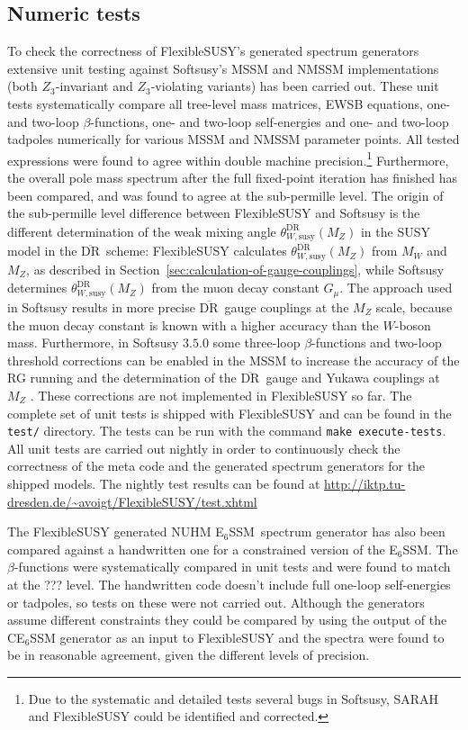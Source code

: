 \documentclass[final,3p,11pt,pdflatex]{elsarticle}
\makeatletter
\newcommand{\fs}{FlexibleSUSY\@\xspace}
\newcommand{\ESSM}{E$_6$SSM\@\xspace}
\newcommand{\code}[1]{\lstinline|#1|}  %
\newcommand{\textoverline}[1]{$\overline{\mbox{#1}}$}
\newcommand{\DRbar}{\textoverline{DR}\xspace}
\newcommand{\secref}[1]{Section~\ref{#1}}
\makeatother
\begin{document}
\subsection{Numeric tests}

To check the correctness of \fs's generated spectrum generators
extensive unit testing against Softsusy's MSSM and NMSSM
implementations (both $Z_3$-invariant and $Z_3$-violating variants)
has been carried out.  These unit tests systematically compare all
tree-level mass matrices, EWSB equations, one- and two-loop
$\beta$-functions, one- and two-loop self-energies and one- and
two-loop tadpoles numerically for various MSSM and NMSSM parameter
points.  All tested expressions were found to agree within double
machine precision.\footnote{Due to the systematic and detailed tests
  several bugs in Softsusy, SARAH and \fs could be identified and
  corrected.}  Furthermore, the overall pole mass spectrum after the
full fixed-point iteration has finished has been compared, and was
found to agree at the sub-permille level.  The origin of the
sub-permille level difference between \fs and Softsusy is the
different determination of the weak mixing angle
$\theta_{W,\text{susy}}^{\text{\DRbar}}(M_Z)$ in the SUSY model in the
\DRbar\ scheme: \fs calculates
$\theta_{W,\text{susy}}^{\text{\DRbar}}(M_Z)$ from $M_W$ and $M_Z$, as
described in \secref{sec:calculation-of-gauge-couplings}, while
Softsusy determines $\theta_{W,\text{susy}}^{\text{\DRbar}}(M_Z)$ from
the muon decay constant $G_\mu$.  The approach used in Softsusy
results in more precise \DRbar\ gauge couplings at the $M_Z$ scale,
because the muon decay constant is known with a higher accuracy than
the $W$-boson mass.  Furthermore, in Softsusy $3.5.0$ some three-loop
$\beta$-functions and two-loop threshold corrections can be enabled in
the MSSM to increase the accuracy of the RG running and the
determination of the \DRbar\ gauge and Yukawa couplings at $M_Z$
\cite{Allanach:2014nba}.  These corrections are not implemented in \fs
so far.  The complete set of unit tests is shipped with \fs and can be
found in the \code{test/} directory.  The tests can be run with the
command \code{make execute-tests}.  All unit tests are carried out
nightly in order to continuously check the correctness of the meta
code and the generated spectrum generators for the shipped models.
The nightly test results can be found at
\url{http://iktp.tu-dresden.de/~avoigt/FlexibleSUSY/test.xhtml}

The \fs generated NUHM \ESSM\ spectrum generator has also been
compared against a handwritten one for a constrained version of the
\ESSM \cite{Athron:2009ue, Athron:2009bs, Athron:2012pw}.  The
$\beta$-functions were systematically compared in unit tests and were
found to match at the ??? level.  The handwritten code doesn't include
full one-loop self-energies or tadpoles, so tests on these were not
carried out.  Although the generators assume different constraints
they could be compared by using the output of the CE$_6$SSM generator
as an input to \fs and the spectra were found to be in reasonable
agreement, given the different levels of precision.
\end{document}
